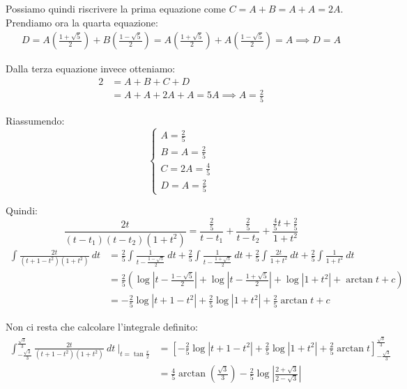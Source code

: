 \documentclass{article}
\begin{document}
\noindent Possiamo quindi riscrivere la prima equazione come $C = A + B = A + A = 2A$. Prendiamo ora la quarta equazione:
\begin{align*}
    D = A\left(\frac{1 + \sqrt{5}}{2}\right) + B\left(\frac{1 - \sqrt{5}}{2}\right) = A\left(\frac{1 + \sqrt{5}}{2}\right) + A\left(\frac{1 - \sqrt{5}}{2}\right) = A \implies D = A
\end{align*}

\noindent Dalla terza equazione invece otteniamo:
\begin{align*}
    2 &= A + B + C + D  \\
    &= A + A +2A + A = 5A \implies A = \frac{2}{5}
\end{align*}

\noindent Riassumendo:
\begin{equation*}
    \begin{cases}
        A = \frac{2}{5} \\
        B = A = \frac{2}{5} \\
        C = 2A = \frac{4}{5} \\
        D = A = \frac{2}{5}
    \end{cases}
\end{equation*}

\noindent Quindi:
\begin{equation*}
    \frac{2t}{(t - t_1)(t - t_2)(1 + t^2)} = \frac{\frac{2}{5}}{t - t_1} + \frac{\frac{2}{5}}{t - t_2} + \frac{\frac{4}{5}t + \frac{2}{5}}{1 + t^2}
\end{equation*}
\begin{align*}
     \int \frac{2t}{(t + 1 - t^2)(1 + t^2)} \ dt &= \frac{2}{5}\int \frac{1}{t - \frac{1 - \sqrt{5}}{2}} \ dt + \frac{2}{5} \int \frac{1}{t - \frac{1 + \sqrt{5}}{2}}  \ dt + \frac{2}{5} \int \frac{2t}{1 + t^2} \ dt + \frac{2}{5} \int \frac{1}{1 + t^2} \ dt \\
     &= \frac{2}{5}\left(\log\left|t - \frac{1 - \sqrt{5}}{2}\right| + \log\left|t - \frac{1 + \sqrt{5}}{2}\right| + \log|1 + t^2| + \arctan t + c \right) \\
     &= -\frac{2}{5}\log|t + 1 - t^2| + \frac{2}{5}\log|1 + t^2| + \frac{2}{5}\arctan t + c
\end{align*}

\noindent Non ci resta che calcolare l'integrale definito:
\begin{align*}
    \int_{-\frac{\sqrt{3}}{3}}^{\frac{\sqrt{3}}{3}} \frac{2t}{(t + 1 - t^2)(1 + t^2)} \ dt \ \Bigg|_{t = \tan\frac{x}{2}} &= \left[-\frac{2}{5}\log|t + 1 - t^2| + \frac{2}{5}\log|1 + t^2| + \frac{2}{5}\arctan t\right]_{-\frac{\sqrt{3}}{3}}^{\frac{\sqrt{3}}{3}} \\
    &=  \frac{4}{5}\arctan\left(\frac{\sqrt{3}}{3}\right) - \frac{2}{5} \log\left|\frac{2 + \sqrt{3}}{2 - \sqrt{3}}\right|
\end{align*}
\end{document}
